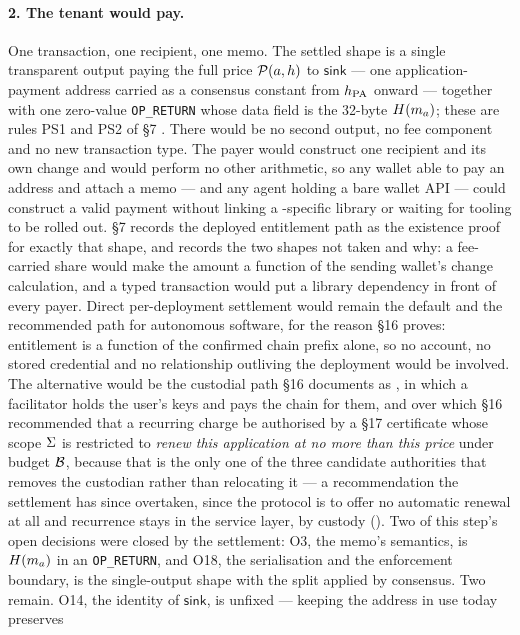\paragraph{2. The tenant would pay.}
One transaction, one recipient, one memo. The settled shape is a single transparent output paying the
full price $\mathcal{P}(a,h)$ to $\mathsf{sink}$ --- one application-payment address carried as a
consensus constant from $h_{\mathrm{PA}}$ onward --- together with one zero-value \texttt{OP\_RETURN} whose data
field is the \num{32}-byte $H(m_{a})$; these are rules PS1 and PS2 of \S7
 . There would be no
second output, no fee component and no new transaction type. The payer would construct one recipient
and its own change and would perform no other arithmetic, so any wallet able to pay an address and
attach a memo --- and any agent holding a bare wallet API --- could construct a valid payment without
linking a \Flux-specific library or waiting for tooling to be rolled out. \S7 records the deployed
\CumulusVPN entitlement path as the existence proof for exactly that shape, and records the two
shapes not taken and why: a fee-carried share would make the amount a function of the sending
wallet's change calculation, and a typed transaction would put a library dependency in front of every
payer. Direct per-deployment settlement would remain the default and the recommended path for
autonomous software, for the reason \S16 proves: entitlement is a function of the confirmed chain
prefix alone, so no account, no stored credential and no relationship outliving the deployment would
be involved. The alternative would be the custodial path \S16 documents as \shipped, in which a
facilitator holds the user's keys and pays the chain for them, and over which \S16 recommended that a
recurring charge be authorised by a \S17 certificate whose scope $\Sigma$ is restricted to
\emph{renew this application at no more than this price} under budget $\mathcal{B}$, because that is the
only one of the three candidate authorities that removes the custodian rather than relocating it ---
a recommendation the settlement has since overtaken, since the protocol is to offer no automatic
renewal at all and recurrence stays in the service layer, by custody ().
Two of this step's open decisions were closed by the settlement: O3, the
memo's semantics, is $H(m_{a})$ in an \texttt{OP\_RETURN}, and O18, the serialisation and the
enforcement boundary, is the single-output shape with the split applied by consensus. Two remain.
O14, the identity of $\mathsf{sink}$, is unfixed --- keeping the address in use today preserves
